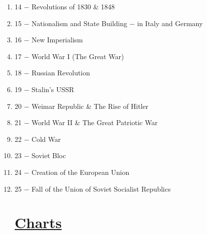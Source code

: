 \documentclass[12pt]{article}
\begin{document}
\begin{enumerate}
\item 14 $-$ Revolutions of 1830 \& 1848

\item 15 $-$ Nationalism and State Building $-$ in Italy and Germany

\item 16 $-$ New Imperialism

\item 17 $-$ World War I (The Great War)

\item 18 $-$ Russian Revolution

\item 19 $-$ Stalin's USSR

\item 20 $-$ Weimar Republic \& The Rise of Hitler

\item 21 $-$ World War II \& The Great Patriotic War

\item 22 $-$ Cold War

\item 23 $-$ Soviet Bloc

\item 24 $-$ Creation of the European Union

\item 25 $-$ Fall of the Union of Soviet Socialist Republics

\section{\underline{Charts}}

\hspace{-25pt} \begin{tabular}{|p{}|p{}|p{}|p{}|p{}|p{}|}


\end{tabular}
\end{enumerate}
\end{document}
